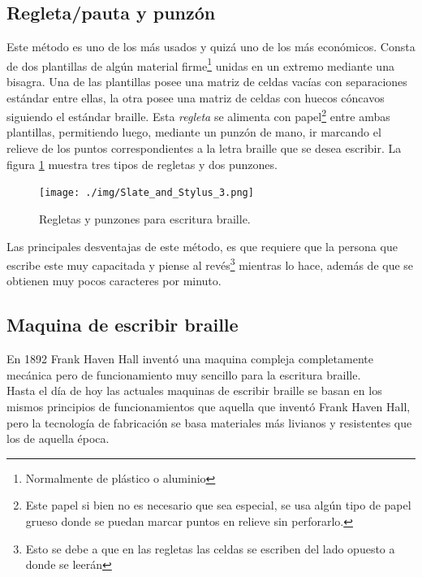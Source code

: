\subsection{Regleta/pauta y punz\'on} 
%
Este m\'etodo es uno de los m\'as usados y quiz\'a uno de los m\'as
econ\'omicos.
Consta de dos plantillas de alg\'un material firme\footnote{Normalmente de
pl\'astico o aluminio} unidas en un extremo mediante una bisagra. Una de las
plantillas posee una matriz de celdas vac\'ias con separaciones est\'andar
entre
ellas, la otra posee una matriz de celdas con huecos c\'oncavos siguiendo el
est\'andar braille. Esta \emph{regleta} se alimenta con papel\footnote{Este
papel si bien no es necesario que sea especial, se usa alg\'un tipo de papel
grueso donde se puedan marcar puntos en relieve sin perforarlo.} entre ambas
plantillas, permitiendo luego, mediante un punz\'on de mano, ir marcando el
relieve de los puntos correspondientes a la letra braille que se desea
escribir. La figura \ref{fig:Slate_and_Stylus_3} muestra tres
tipos de regletas y dos punzones.

\begin{figure}[htp]
\centering
\texttt{[image: ./img/Slate\_and\_Stylus\_3.png]}
\caption{Regletas y punzones para escritura braille.}
\label{fig:Slate_and_Stylus_3}
\end{figure}

Las principales desventajas de este m\'etodo, es que requiere que la persona
que escribe este muy capacitada y piense al rev\'es\footnote{Esto se debe a que
en las regletas las celdas se escriben del lado opuesto a donde se leer\'an}
mientras lo hace, adem\'as de que se obtienen muy pocos caracteres por minuto.

\subsection{Maquina de escribir braille}
%
En 1892 Frank Haven Hall
invent\'o una maquina
compleja completamente mec\'anica pero de funcionamiento muy sencillo para la
escritura braille.\\

Hasta el d\'ia de hoy las actuales maquinas de escribir braille se basan en los
mismos principios de funcionamientos que aquella que invent\'o Frank Haven
Hall,
pero la tecnolog\'ia de fabricaci\'on se basa materiales m\'as livianos y
resistentes que los de aquella \'epoca. \\

